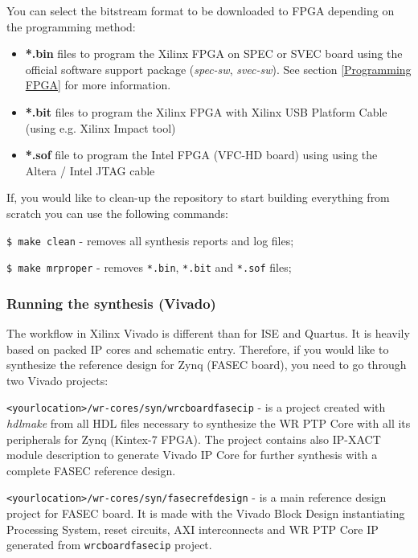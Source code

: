 \documentclass[a4paper, 12pt]{article}
\renewcommand{\_}{\underscore\allowbreak}
\begin{document}
You can select the bitstream format to be downloaded to FPGA depending on the
programming method:
\begin{itemize}
  \item \textbf{*.bin} files to program the Xilinx FPGA on SPEC or SVEC board
    using the official software support package (\textit{spec-sw},
    \textit{svec-sw}). See section \ref{Programming FPGA} for more
    information.
  \item \textbf{*.bit} files to program the Xilinx FPGA with Xilinx USB Platform
    Cable (using e.g. Xilinx Impact tool)
  \item \textbf{*.sof} file to program the Intel FPGA (VFC-HD board) using using
    the Altera / Intel JTAG cable
\end{itemize}

If, you would like to clean-up the repository to start building everything from
scratch you can use the following commands:
\begin{itemize*}
\item \texttt{\$ make clean} - removes all synthesis reports and log files;
\item \texttt{\$ make mrproper} - removes \texttt{*.bin}, \texttt{*.bit} and
  \texttt{*.sof} files;
\end{itemize*}

\subsubsection{Running the synthesis (Vivado)}
The workflow in Xilinx Vivado is different than for ISE and Quartus. It is
heavily based on packed IP cores and schematic entry. Therefore, if you would
like to synthesize the reference design for Zynq (FASEC board), you
need to go through two Vivado projects:
\begin{itemize*}
  \item \texttt{<your\_location>/wr-cores/syn/wrc\_board\_fasec\_ip} - is a
    project created with \textit{hdlmake} from all HDL files necessary to
    synthesize the WR PTP Core with all its peripherals for Zynq (Kintex-7 FPGA).
    The project contains also IP-XACT module description to generate Vivado IP
    Core for further synthesis with a complete FASEC reference design.
  \item \texttt{<your\_location>/wr-cores/syn/fasec\_ref\_design} - is a main
    reference design project for FASEC board. It is made with the Vivado Block
    Design instantiating Processing System, reset circuits, AXI interconnects
    and WR PTP Core IP generated from \texttt{wrc\_board\_fasec\_ip} project.
\end{itemize*}
\end{document}
